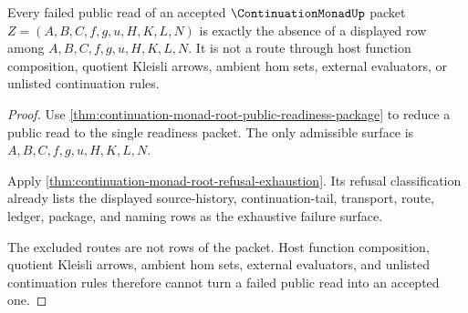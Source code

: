 \begin{theorem}
\label{thm:continuation-monad-root-public-refusal-totality}
Every failed public read of an accepted $\ContinuationMonadUp$ packet
$Z=(A,B,C,f,g,u,H,K,L,N)$ is exactly the absence of a displayed row among
$A,B,C,f,g,u,H,K,L,N$. It is not a route through host function composition,
quotient Kleisli arrows, ambient hom sets, external evaluators, or unlisted
continuation rules.
\end{theorem}
\begin{proof}
Use \autoref{thm:continuation-monad-root-public-readiness-package} to reduce a
public read to the single readiness packet. The only admissible surface is
$A,B,C,f,g,u,H,K,L,N$.

Apply \autoref{thm:continuation-monad-root-refusal-exhaustion}. Its refusal
classification already lists the displayed source-history, continuation-tail,
transport, route, ledger, package, and naming rows as the exhaustive failure
surface.

The excluded routes are not rows of the packet. Host function composition,
quotient Kleisli arrows, ambient hom sets, external evaluators, and unlisted
continuation rules therefore cannot turn a failed public read into an accepted
one.
\end{proof}

